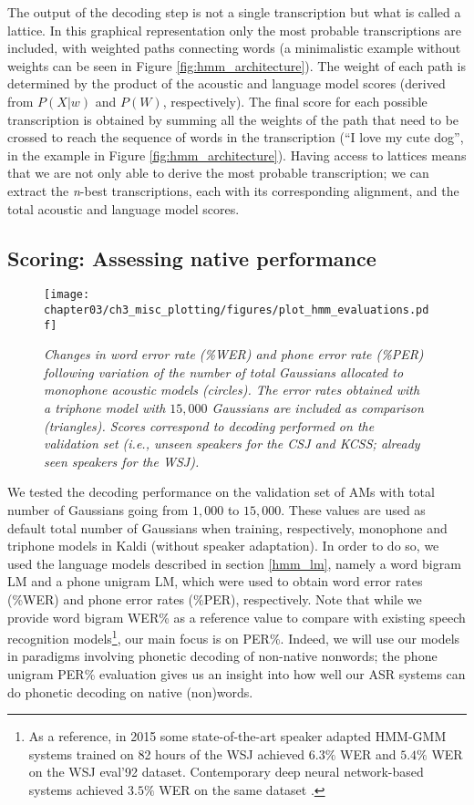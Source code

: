 The output of the decoding step is not a single transcription but what is called a lattice. In this graphical representation only the most probable transcriptions are included, with weighted paths connecting words (a minimalistic example without weights can be seen in Figure \ref{fig:hmm_architecture}). The weight of each path is determined by the product of the acoustic and language model scores (derived from $P(X|w)$ and $P(W)$, respectively). The final score for each possible transcription is obtained by summing all the weights of the path that need to be crossed to reach the sequence of words in the transcription (``I love my cute dog'', in the example in Figure \ref{fig:hmm_architecture}). Having access to lattices means that we are not only able to derive the most probable transcription; we can extract the \textit{n}-best transcriptions, each with its corresponding alignment, and the total acoustic and language model scores.   

\subsection{Scoring: Assessing native performance}

\begin{figure}[htb]
\centering
\texttt{[image: chapter03/ch3\_misc\_plotting/figures/plot\_hmm\_evaluations.pdf]}
\caption{\textit{Changes in word error rate (\%WER) and phone error rate (\%PER) following variation of the number of total Gaussians allocated to monophone acoustic models (circles). The error rates obtained with a triphone model with $15,000$ Gaussians are included as comparison (triangles). Scores correspond to decoding performed on the validation set (i.e., unseen speakers for the CSJ and KCSS; already seen speakers for the WSJ).}}
\label{fig:hmm_gaussians}
\end{figure}


We tested the decoding performance on the validation set of AMs with total number of Gaussians going from $1,000$ to $15,000$. These values are used as default total number of Gaussians when training, respectively, monophone and triphone models in Kaldi (without speaker adaptation).
In order to do so, we used the language models described in section \ref{hmm_lm}, namely a word bigram LM and a phone unigram LM, which were used to obtain word error rates (\%WER) and phone error rates (\%PER), respectively. Note that while we provide word bigram WER\% as a reference value to compare with existing speech recognition models\footnote{As a reference, in 2015 some state-of-the-art speaker adapted HMM-GMM systems trained on 82 hours of the WSJ achieved $6.3\%$ WER \cite{panayotov2015} and $5.4\%$ WER \cite{chan2015} on the WSJ eval'92 dataset. Contemporary deep neural network-based systems achieved $3.5\%$ WER on the same dataset \cite{chan2015}.}, our main focus is on PER\%. Indeed, we will use our models in paradigms involving phonetic decoding of non-native nonwords; the phone unigram PER\% evaluation gives us an insight into how well our ASR systems can do phonetic decoding on native (non)words. 

